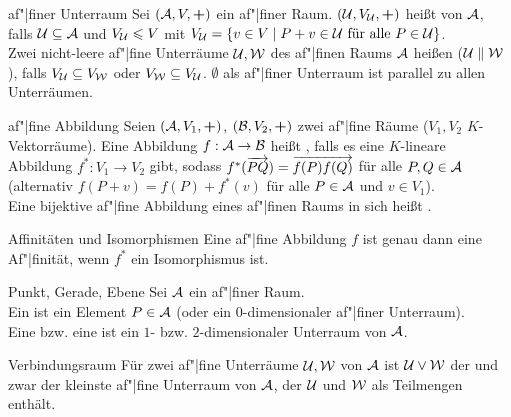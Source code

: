 \begin{Def}{af"|finer Unterraum}
    Sei $(\mathcal{A}, V, \boldsymbol{+})$ ein af"|finer Raum.
    $(\mathcal{U}, V_{\mathcal{U}}, \boldsymbol{+})$ heißt
     von $\mathcal{A}$, falls
    $\mathcal{U} \subseteq \mathcal{A}$ und $V_{\mathcal{U}} \leqslant V$ mit
    $V_{\mathcal{U}} = \{v \in V \;|\;
    P + v \in \mathcal{U} \text{ für alle } P \in \mathcal{U}\}$. \\
    Zwei nicht-leere af"|fine Unterräume $\mathcal{U}, \mathcal{W}$ des af"|finen
    Raums $\mathcal{A}$ heißen 
    ($\mathcal{U} \parallel \mathcal{W}$),
    falls $V_{\mathcal{U}} \subseteq V_{\mathcal{W}}$ oder
    $V_{\mathcal{W}} \subseteq V_{\mathcal{U}}$.
    $\emptyset$ als af"|finer Unterraum ist parallel zu allen Unterräumen.
\end{Def}

\begin{Def}{af"|fine Abbildung}
    Seien $(\mathcal{A}, V_1, \boldsymbol{+})$,
    $(\mathcal{B}, V_2, \boldsymbol{+})$ zwei af"|fine Räume
    ($V_1, V_2$ $K$-Vektorräume).
    Eine Abbildung $f: \mathcal{A} \rightarrow \mathcal{B}$ heißt
    , falls es eine $K$-lineare Abbildung
    $f^\ast: V_1 \rightarrow V_2$ gibt,
    sodass $f^\ast(\overrightarrow{PQ}) = \overrightarrow{f(P) f(Q)}$ für alle
    $P, Q \in \mathcal{A}$ \\
    (alternativ $f(P + v) = f(P) + f^\ast(v)$ für alle
    $P \in \mathcal{A}$ und $v \in V_1$). \\
    Eine bijektive af"|fine Abbildung eines af"|finen Raums in sich heißt
    .
\end{Def}

\begin{Lemma}{Af{}finitäten und Isomorphismen}
    Eine af"|fine Abbildung $f$ ist genau dann eine Af"|finität, wenn
    $f^\ast$ ein Isomorphismus ist.
\end{Lemma}

\begin{Def}{Punkt, Gerade, Ebene}
    Sei $\mathcal{A}$ ein af"|finer Raum. \\
    Ein  ist ein Element $P \in \mathcal{A}$
    (oder ein $0$-dimensionaler af"|finer Unterraum). \\
    Eine  bzw. eine  ist ein $1$- bzw.
    $2$-dimensionaler Unterraum von $\mathcal{A}$.
\end{Def}

\begin{Def}{Verbindungsraum}
    Für zwei af"|fine Unterräume $\mathcal{U}, \mathcal{W}$ von $\mathcal{A}$ ist
    $\mathcal{U} \lor \mathcal{W}$ der  und zwar
    der kleinste af"|fine Unterraum von $\mathcal{A}$, der $\mathcal{U}$ und
    $\mathcal{W}$ als Teilmengen enthält.
\end{Def}

